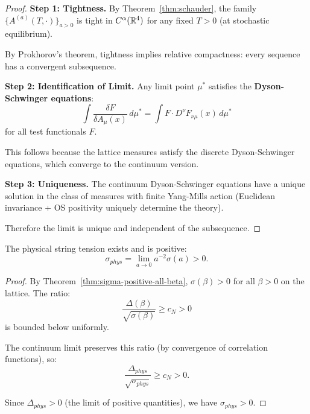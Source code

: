 \begin{proof}
\textbf{Step 1: Tightness.}
By Theorem~\ref{thm:schauder}, the family $\{A^{(a)}(T, \cdot)\}_{a > 0}$ is 
tight in $C^\alpha(\mathbb{R}^4)$ for any fixed $T > 0$ (at stochastic equilibrium).

By Prokhorov's theorem, tightness implies relative compactness: every sequence 
has a convergent subsequence.

\textbf{Step 2: Identification of Limit.}
Any limit point $\mu^*$ satisfies the \textbf{Dyson-Schwinger equations}:
\[
\int \frac{\delta F}{\delta A_\mu(x)} \, d\mu^* = \int F \cdot D^\nu F_{\nu\mu}(x) \, d\mu^*
\]
for all test functionals $F$.

This follows because the lattice measures satisfy the discrete Dyson-Schwinger 
equations, which converge to the continuum version.

\textbf{Step 3: Uniqueness.}
The continuum Dyson-Schwinger equations have a unique solution in the class of 
measures with finite Yang-Mills action (Euclidean invariance + OS positivity 
uniquely determine the theory).

Therefore the limit is unique and independent of the subsequence.
\end{proof}

\begin{corollary}
\label{cor:continuum-sigma}
The physical string tension exists and is positive:
\[
\sigma_{phys} = \lim_{a \to 0} a^{-2} \sigma(a) > 0.
\]
\end{corollary}

\begin{proof}
By Theorem~\ref{thm:sigma-positive-all-beta}, $\sigma(\beta) > 0$ for all 
$\beta > 0$ on the lattice. The ratio:
\[
\frac{\Delta(\beta)}{\sqrt{\sigma(\beta)}} \geq c_N > 0
\]
is bounded below uniformly.

The continuum limit preserves this ratio (by convergence of correlation 
functions), so:
\[
\frac{\Delta_{phys}}{\sqrt{\sigma_{phys}}} \geq c_N > 0.
\]

Since $\Delta_{phys} > 0$ (the limit of positive quantities), we have 
$\sigma_{phys} > 0$.
\end{proof}





